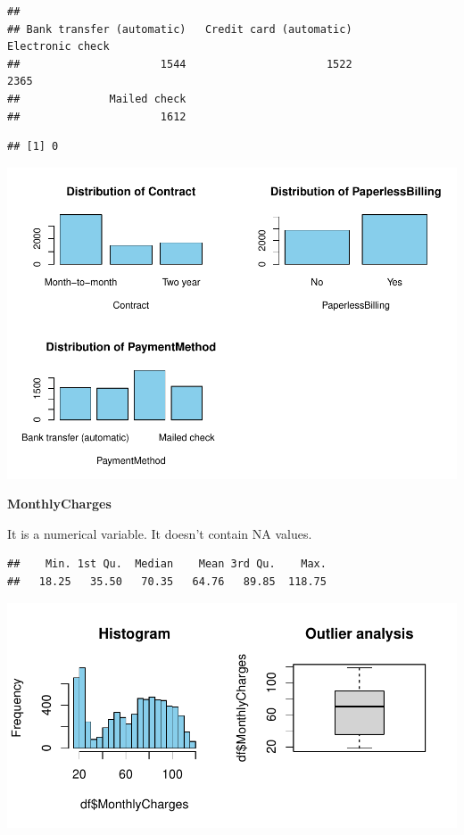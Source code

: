 \documentclass[
  twoside]{article}
\newenvironment{Shaded}{\begin{snugshade}}{\end{snugshade}}
\newcommand{\FunctionTok}[1]{\textcolor[rgb]{0.13,0.29,0.53}{\textbf{#1}}}
\newcommand{\NormalTok}[1]{#1}
\newcommand{\SpecialCharTok}[1]{\textcolor[rgb]{0.81,0.36,0.00}{\textbf{#1}}}
\begin{document}
\begin{verbatim}
## 
## Bank transfer (automatic)   Credit card (automatic)          Electronic check 
##                      1544                      1522                      2365 
##              Mailed check 
##                      1612
\end{verbatim}

\begin{Shaded}
\end{Shaded}

\begin{verbatim}
## [1] 0
\end{verbatim}

\includegraphics{Assigment2_files/figure-latex/unnamed-chunk-32-1.pdf}

\textbf{MonthlyCharges}

It is a numerical variable. It doesn't contain NA values.

\begin{verbatim}
##    Min. 1st Qu.  Median    Mean 3rd Qu.    Max. 
##   18.25   35.50   70.35   64.76   89.85  118.75
\end{verbatim}

\includegraphics{Assigment2_files/figure-latex/unnamed-chunk-33-1.pdf}
\end{document}
